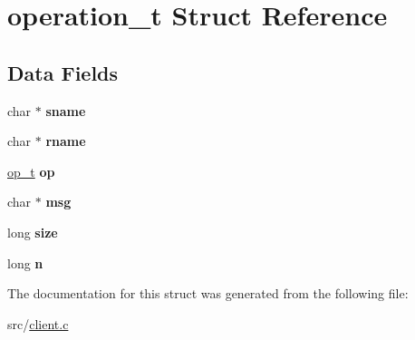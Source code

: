 \hypertarget{structoperation__t}{}\section{operation\+\_\+t Struct Reference}
\label{structoperation__t}
\subsection*{Data Fields}
\begin{DoxyCompactItemize}
\item 
\mbox{\label{structoperation__t_a596940e8f95dfc43bb298b5e8148c770}} 
char $\ast$ {\bfseries sname}
\item 
\mbox{\label{structoperation__t_a4abc08d8bf8e71d81f1928b77675d9a8}} 
char $\ast$ {\bfseries rname}
\item 
\mbox{\label{structoperation__t_a26b2efa792334cce1cd82d1c63754539}} 
\hyperlink{ops_8h_ac6fa1b34da8872e34c2936391332f44c}{op\+\_\+t} {\bfseries op}
\item 
\mbox{\label{structoperation__t_a32d2f5216cddb59c7cc8fb2806a7e727}} 
char $\ast$ {\bfseries msg}
\item 
\mbox{\label{structoperation__t_a37363161b41c4165b98cba7abc7a9d95}} 
long {\bfseries size}
\item 
\mbox{\label{structoperation__t_a0a627514f9cfe29006d6bcd8e4ba2b2e}} 
long {\bfseries n}
\end{DoxyCompactItemize}


The documentation for this struct was generated from the following file\+:\begin{DoxyCompactItemize}
\item 
src/\hyperlink{client_8c}{client.\+c}\end{DoxyCompactItemize}
